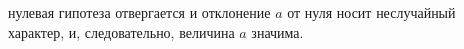 нулевая гипотеза отвергается и отклонение $ a $ от нуля носит неслучайный характер, и, следовательно, величина $ a $ значима.